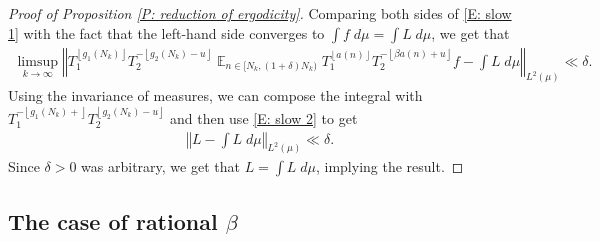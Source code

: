 \documentclass[11pt]{amsart}
\theoremstyle{definition}
\DeclareMathOperator*{\E}{\mathbb{E}}
\newcommand{\CX}{{\mathcal X}}
\newcommand{\norm}[1]{\left\Vert #1\right\Vert}
\newcommand{\1}{{\mathbf{1}}}
\newcommand{\floor}[1]{{\left \lfloor #1 \right \rfloor}}
\begin{document}
\begin{proof}[Proof of Proposition \ref{P: reduction of ergodicity}]
Comparing both sides of \eqref{E: slow 1} with the fact that the left-hand side converges to $\int f\; d\mu = \int L\; d\mu$, we get that
\begin{align*}
    \limsup_{k\to\infty}\norm{T_1^{\floor{g_1(N_k)}}T_2^{-\floor{g_2(N_k)-u}}\E_{n\in [N_k, (1+\delta)N_k)} T_1^{\floor{{a}(n)}}T_2^{-\floor{\beta {a}(n)+u}}f - \int L\; d\mu}_{L^2(\mu)}\ll \delta. 
\end{align*}
Using the invariance of measures, we can compose the integral with $T_1^{-\floor{g_1(N_k)+}}T_2^{\floor{g_2(N_k)-u}}$ and then use \eqref{E: slow 2} to get
\begin{align*}
    \norm{L - \int L\; d\mu}_{L^2(\mu)}\ll \delta.
\end{align*}
Since $\delta>0$ was arbitrary, we get that $L = \int L\; d\mu$, implying the result.
\end{proof}



\subsection{The case of rational $\beta$}\label{SS: beta rational}
\end{document}
